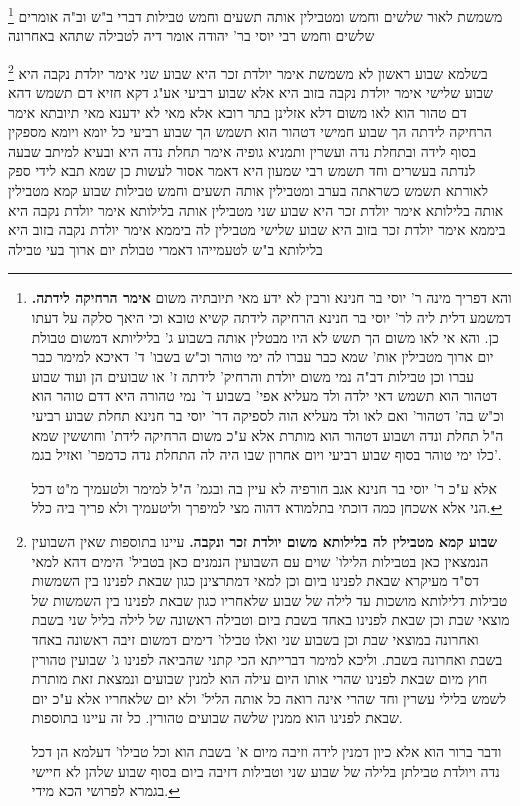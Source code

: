 \documentclass[12pt, openany]{book}
\newcommand{\footnotecomment}[1]{
	\renewcommand\thefootnote{}
	\footnote{#1}}
\newcommand{\commenta}[1]{\footnotecomment{#1}}
\begin{document}
{\commenta{ והא דפריך מינה ר' יוסי בר חנינא ורבין לא ידע מאי תיובתיה משום \textbf{אימר הרחיקה לידתה.} דמשמע דלית ליה לר' יוסי בר חנינא הרחיקה לידתה קשיא טובא וכי היאך סלקה על דעתו כן. והא אי לאו משום הך תשש לא היו מבטלין אותה בשבוע ג' בליליותא דמשום טבולת יום ארוך מטבילין אות' שמא כבר עברו לה ימי טוהר וכ"ש בשבו' ד' דאיכא למימר כבר עברו וכן טבילות דב"ה נמי משום יולדת והרחיק' לידתה ז' או שבועים הן ועוד שבוע דטהור הוא תשמש דאי ילדה ולד מעליא אפי' בשבוע ד' נמי טהורה היא דדם טוהר הוא וכ"ש בה' דטהור' ואם לאו ולד מעליא הוה לספיקה דר' יוסי בר חנינא תחלת שבוע רביעי ה"ל תחלת ונדה ושבוע דטהור הוא מותרת אלא ע"כ משום הרחיקה לידת' וחוששין שמא כלו ימי טוהר בסוף שבוע רביעי ויום אחרון שבו היה לה התחלת נדה כדמפר' ואזיל בגמ'.\par אלא ע"כ ר' יוסי בר חנינא אגב חורפיה לא עיין בה ובגמ' ה"ל למימר ולטעמיך מ"ט דכל הני אלא אשכחן כמה דוכתי בתלמודא דהוה מצי למיפרך וליטעמיך ולא פריך ביה כלל. }
משמשת לאור שלשים וחמש ומטבילין אותה תשעים וחמש טבילות דברי ב"ש וב"ה אומרים שלשים וחמש רבי יוסי בר' יהודה אומר דיה לטבילה שתהא באחרונה 
\commenta{\textbf{שבוע קמא מטבילין לה בלילותא משום יולדת זכר ונקבה.} עיינו בתוספות שאין השבועין הנמצאין כאן בטבילות הלילו' שוים עם השבועין הנמנים כאן בטביל' הימים דהא למאי דס"ד מעיקרא שבאת לפנינו ביום וכן למאי דמתרצינן כגון שבאת לפנינו בין השמשות טבילות דלילותא מושכות עד לילה של שבוע שלאחריו כגון שבאת לפנינו בין השמשות של מוצאי שבת וכן שבאת לפנינו באחד בשבת ביום וטבילה ראשונה של לילה בליל שני בשבת ואחרונה במוצאי שבת וכן בשבוע שני ואלו טבילו' דימים דמשום זיבה ראשונה באחד בשבת ואחרונה בשבת. וליכא למימר דברייתא הכי קתני שהביאה לפנינו ג' שבועין טהורין חוץ מיום שבאת לפנינו שהרי אותו היום עילה הוא למנין שבועים ונמצאת זאת מותרת לשמש בלילי עשרין וחד שהרי אינה רואה כל אותה הליל' ולא יום שלאחריו אלא ע"כ יום שבאת לפנינו הוא ממנין שלשה שבועים טהורין. כל זה עיינו בתוספות.\par ודבר ברור הוא אלא כיון דמנין לידה וזיבה מיום א' בשבת הוא וכל טבילו' דעלמא הן דכל נדה ויולדת טבילתן בלילה של שבוע שני וטבילות דזיבה ביום בסוף שבוע שלהן לא חיישי בגמרא לפרושי הכא מידי. }
בשלמא שבוע ראשון לא משמשת אימר יולדת זכר היא שבוע שני אימר יולדת נקבה היא
שבוע שלישי אימר יולדת נקבה בזוב היא
אלא שבוע רביעי אע"ג דקא חזיא דם תשמש דהא דם טהור הוא לאו משום דלא אזלינן בתר רובא 
אלא מאי לא ידענא מאי תיובתא אימר הרחיקה לידתה 
הך שבוע חמישי דטהור הוא תשמש 
הך שבוע רביעי כל יומא ויומא מספקין בסוף לידה ובתחלת נדה ועשרין ותמניא גופיה אימר תחלת נדה היא ובעיא למיתב שבעה לנדתה 
בעשרים וחד תשמש 
רבי שמעון היא דאמר אסור לעשות כן שמא תבא לידי ספק לאורתא תשמש כשראתה בערב 
ומטבילין אותה תשעים וחמש טבילות שבוע קמא מטבילין אותה בלילותא אימר יולדת זכר היא 
שבוע שני מטבילין אותה בלילותא אימר יולדת נקבה היא ביממא אימר יולדת זכר בזוב היא 
שבוע שלישי מטבילין לה ביממא אימר יולדת נקבה בזוב היא
בלילותא ב"ש לטעמייהו דאמרי טבולת יום ארוך בעי טבילה}
\end{document}

